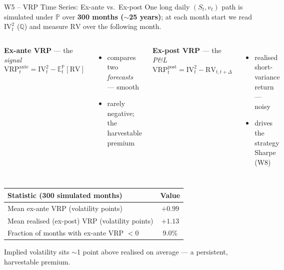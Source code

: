 \documentclass[aspectratio=169, 11pt]{beamer}
\begin{document}
\begin{frame}{W5 -- VRP Time Series: Ex-ante vs.\ Ex-post}
\small
One long daily $(S_t, v_t)$ path is simulated under $\mathbb{P}$ over
\textbf{300 months ($\sim$25 years)}; at each month start we read $\mathrm{IV}_t^2$ ($\mathbb{Q}$)
and measure $\mathrm{RV}$ over the following month.

\medskip
\begin{columns}[T]
\textbf{Ex-ante VRP} --- the \textit{signal}
\[
  \mathrm{VRP}^{\text{ante}}_t = \mathrm{IV}_t^2 - \mathbb{E}^{\mathbb{P}}_t[\mathrm{RV}]
\]
\begin{itemize}
  \item compares two \textit{forecasts} --- smooth
  \item rarely negative; the harvestable premium
\end{itemize}

\textbf{Ex-post VRP} --- the \textit{P\&L}
\[
  \mathrm{VRP}^{\text{post}}_t = \mathrm{IV}_t^2 - \mathrm{RV}_{t,t+\Delta}
\]
\begin{itemize}
  \item realised short-variance return --- noisy
  \item drives the strategy Sharpe (W8)
\end{itemize}
\end{columns}

\vspace{4pt}
\begin{center}
\begin{tabular}{lc}
  \toprule
  Statistic (300 simulated months) & Value \\
  \midrule
  Mean ex-ante VRP (volatility points) & $+0.99$ \\
  Mean realised (ex-post) VRP (volatility points) & $+1.13$ \\
  Fraction of months with ex-ante VRP $< 0$ & $9.0\%$ \\
  \bottomrule
\end{tabular}
\end{center}

\centering\footnotesize
Implied volatility sits $\sim$1 point above realised on average --- a persistent, harvestable premium.
\end{frame}
\end{document}
